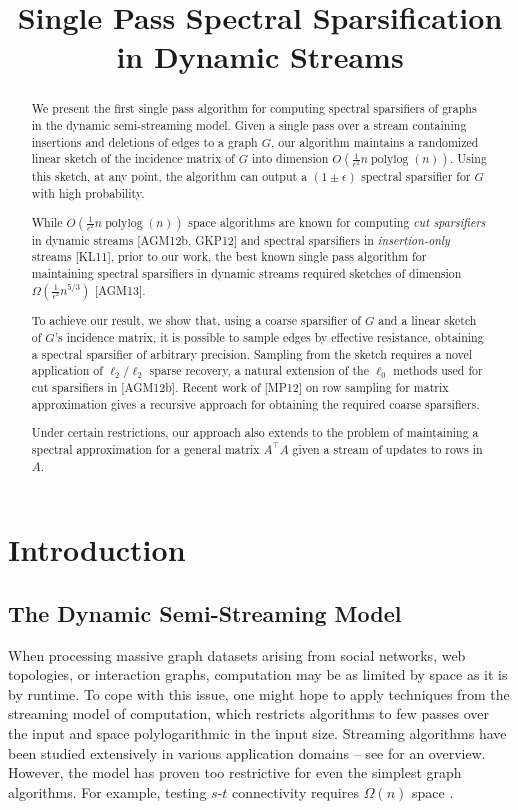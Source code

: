 \documentclass[11pt]{article}
\title{Single Pass Spectral Sparsification in Dynamic Streams}
\author{\and\and
Michael Kapralov\\MIT\\ {kapralov@mit.edu}
\and
Yin Tat Lee\\MIT\\ {yintat@mit.edu}
\and
Cameron Musco\\MIT\\ {cnmusco@mit.edu}
\and\and
Christopher Musco\\MIT\\ {cpmusco@mit.edu}
\and
Aaron Sidford\\MIT\\ {sidford@mit.edu}
}
\date{}
\newcommand{\plog}{\mathop\mathrm{polylog}}
\begin{document}
\maketitle
\begin{abstract}
We present the first single pass algorithm for computing spectral sparsifiers of graphs in the dynamic semi-streaming model. Given a single pass over a stream containing insertions and deletions of edges to a graph $G$, our algorithm maintains a randomized linear sketch of the incidence matrix of $G$ into dimension $O(\frac{1}{\epsilon^2}n\plog (n))$.
Using this sketch, at any point, the algorithm can output a $(1 \pm \epsilon)$ spectral sparsifier for $G$ with high probability. 

While $O(\frac{1}{\epsilon^2} n \plog(n))$ space algorithms are known for computing \emph{cut sparsifiers} in dynamic streams [AGM12b, GKP12] and spectral sparsifiers in \emph{insertion-only} streams [KL11], prior to our work, the best known single pass algorithm for maintaining spectral sparsifiers in dynamic streams required sketches  of dimension $\Omega(\frac{1}{\epsilon^2}n^{5/3})$ [AGM13].

To achieve our result, we show that, using a coarse sparsifier of  $G$ and a linear sketch of $G$'s incidence matrix, it is possible to sample edges by effective resistance,  obtaining a spectral sparsifier of arbitrary precision. Sampling from the sketch requires a novel application of $\ell_2/\ell_2$ sparse recovery, a natural extension of the $\ell_0$ methods used for cut sparsifiers in [AGM12b]. Recent work of [MP12] on row sampling for matrix approximation gives a recursive approach for obtaining the required coarse sparsifiers. 

Under certain restrictions, our approach also extends to the problem of maintaining a spectral approximation for a general matrix $A^\top A$ given a stream of updates to rows in $A$.

\end{abstract}
\thispagestyle{empty}


\clearpage
\setcounter{page}{1}

\section{Introduction}
\subsection{The Dynamic Semi-Streaming Model}
When processing massive graph datasets arising from social networks, web topologies, or interaction graphs, computation may be as limited by space as it is by runtime. To cope with this issue, one might hope to apply techniques
from the streaming model of computation, which restricts algorithms to few passes over the input and space polylogarithmic in the input size. Streaming algorithms
have been studied extensively in various application domains -- see \cite{muthukrishnan2005data} for an overview. However, the model has proven too restrictive for even the
simplest graph algorithms. For example, testing $s$-$t$ connectivity requires
$\Omega(n)$ space \cite{henz:lb}. 
\end{document}
